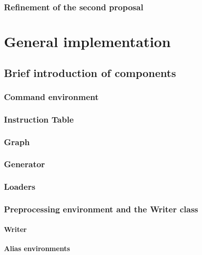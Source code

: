         \subsection{Refinement of the second proposal} 

\chapter{General implementation}

    \section{Brief introduction of components}

        \subsection{Command environment}

        \subsection{Instruction Table} 

        \subsection{Graph}

        \subsection{Generator}

        \subsection{Loaders}

        \subsection{Preprocessing environment and the Writer class}

            \subsubsection{Writer}

            \subsubsection{Alias environments}

